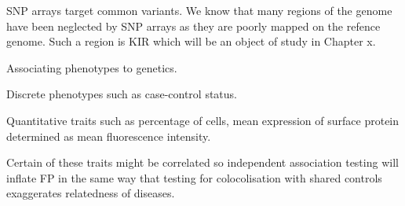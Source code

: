 SNP arrays target common variants.
We know that many regions of the genome have been neglected by SNP arrays as they are poorly mapped on the refence genome.
Such a region is KIR which will be an object of study in Chapter x.




Associating phenotypes to genetics.

Discrete phenotypes such as case-control status.

Quantitative traits such as percentage of cells, mean expression of surface protein determined as mean fluorescence intensity.

Certain of these traits might be correlated so independent association testing will inflate FP in the same way that testing for colocolisation with shared controls
exaggerates relatedness of diseases.


